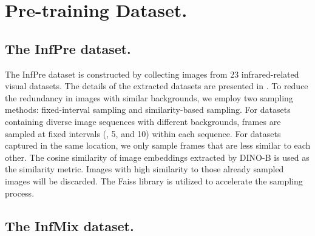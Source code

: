 \section{Pre-training Dataset.}
\label{app:pretraining_dataset}
\subsection{The InfPre dataset.}
\label{app:infpre}

The InfPre dataset is constructed by collecting images from 23 infrared-related visual datasets. The details of the extracted datasets are presented in . To reduce the redundancy in images with similar backgrounds, we employ two sampling methods: fixed-interval sampling and similarity-based sampling. For datasets containing diverse image sequences with different backgrounds, frames are sampled at fixed intervals (, 5, and 10) within each sequence. For datasets captured in the same location, we only sample frames that are less similar to each other. The cosine similarity of image embeddings extracted by DINO-B is used as the similarity metric. Images with high similarity to those already sampled images will be discarded. The Faiss \citep{faiss} library is utilized to accelerate the sampling process.



\subsection{The InfMix dataset.}


\begin{table}[t]
    \centering
    \caption{The cosine similarity between pre-training and infrared segmentation datasets. The embeddings of images are extracted by DINO-B. The similarity is averaged over all pairwise images from different datasets.}
    \label{tab:domain_gap}
    \vspace{1mm}
    \scriptsize
    \vspace{-3mm}
\end{table}

